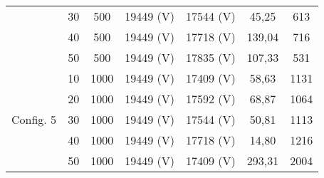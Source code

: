 \begin{table}[htbp]
\begin{tabular}{rcccccc}
    \multicolumn{1}{c}{} & 30    & 500   & 19449 (V) & 17544 (V) & 45,25 & 613 \\
    \multicolumn{1}{c}{} & 40    & 500   & 19449 (V) & 17718 (V) & 139,04 & 716 \\
    \multicolumn{1}{c}{} & 50    & 500   & 19449 (V) & 17835 (V) & 107,33 & 531 \\
    \multicolumn{1}{c}{\multirow{5}[2]{*}{Config. 5}} & 10    & 1000  & 19449 (V) & 17409 (V) & 58,63 & 1131 \\
    \multicolumn{1}{c}{} & 20    & 1000  & 19449 (V) & 17592 (V) & 68,87 & 1064 \\
    \multicolumn{1}{c}{} & 30    & 1000  & 19449 (V) & 17544 (V) & 50,81 & 1113 \\
    \multicolumn{1}{c}{} & 40    & 1000  & 19449 (V) & 17718 (V) & 14,80 & 1216 \\
    \multicolumn{1}{c}{} & 50    & 1000  & 19449 (V) & 17409 (V) & 293,31 & 2004 \\
    \bottomrule
    \end{tabular}%
  \label{tab:addlabel}%
\end{table}%
